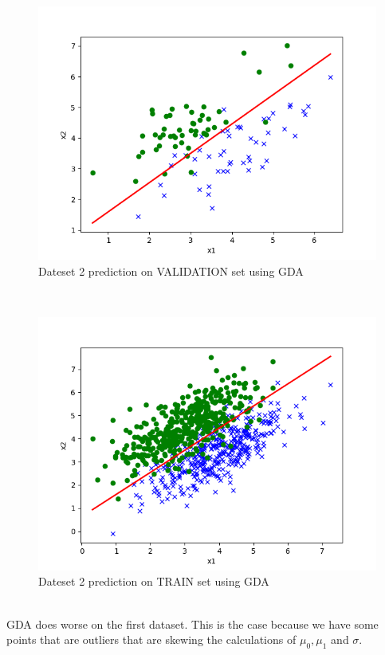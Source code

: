 \begin{answer}
\begin{figure}
  \includegraphics[width=\linewidth]{../src/output/p01e_pred_2_eval.png}
  \caption{Dateset 2 prediction on VALIDATION set using GDA}
  \label{fig:Dateset 2 prediction on VALIDATION set using GDA}
\end{figure}\\
\begin{figure}
  \includegraphics[width=\linewidth]{../src/output/p01e_pred_2_train.png}
  \caption{Dateset 2 prediction on TRAIN set using GDA}
  \label{fig:Dateset 2 prediction on TRAIN set using GDA}
\end{figure}\\
GDA does worse on the first dataset. This is the case because we have some points that are outliers that are skewing the calculations of $\mu_0, \mu_1$ and $\sigma$. 
\end{answer}
